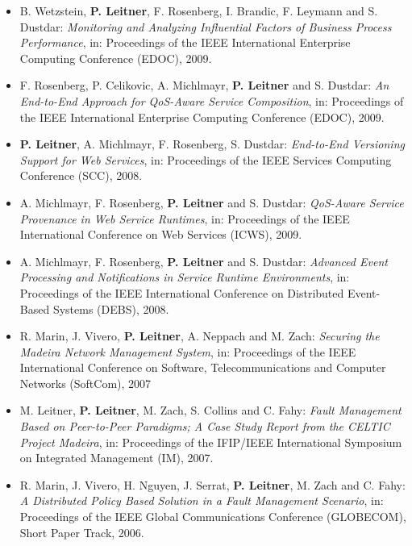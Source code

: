 \documentclass[paper=letter,fontsize=11pt]{scrartcl} %
\begin{document}
\begin{itemize}
\item B. Wetzstein, \textbf{P. Leitner}, F. Rosenberg, I. Brandic, F. Leymann and S. Dustdar: \emph{Monitoring and Analyzing Influential Factors of Business Process Performance}, in: Proceedings of the IEEE International Enterprise Computing Conference (EDOC), 2009. 
\item F. Rosenberg, P. Celikovic, A. Michlmayr, \textbf{P. Leitner} and S. Dustdar: \emph{An End-to-End Approach for QoS-Aware Service Composition}, in: Proceedings of the IEEE International Enterprise Computing Conference (EDOC), 2009. 
\item \textbf{P. Leitner}, A. Michlmayr, F. Rosenberg, S. Dustdar: \emph{End-to-End Versioning Support for Web Services}, in: Proceedings of the IEEE Services Computing Conference (SCC), 2008. 
\item A. Michlmayr, F. Rosenberg, \textbf{P. Leitner} and S. Dustdar: \emph{QoS-Aware Service Provenance in Web Service Runtimes}, in: Proceedings of the IEEE International Conference on Web Services (ICWS), 2009. 
\item A. Michlmayr, F. Rosenberg, \textbf{P. Leitner} and S. Dustdar: \emph{Advanced Event Processing and Notifications in Service Runtime Environments}, in: Proceedings of the IEEE International Conference on Distributed Event-Based Systems (DEBS), 2008. 
\item R. Marin, J. Vivero, \textbf{P. Leitner}, A. Neppach and M. Zach: \emph{Securing the Madeira Network Management System}, in: Proceedings of the IEEE International Conference on Software, Telecommunications and Computer Networks (SoftCom), 2007
\item M. Leitner, \textbf{P. Leitner}, M. Zach, S. Collins and C. Fahy: \emph{Fault
Management Based on Peer-to-Peer Paradigms; A Case Study Report from the CELTIC
Project Madeira}, in: Proceedings of the IFIP/IEEE International Symposium on Integrated
Management (IM), 2007. 
\item R. Marin, J. Vivero, H. Nguyen, J. Serrat, \textbf{P. Leitner}, M. Zach and C. Fahy: \emph{A Distributed Policy Based Solution in a Fault Management Scenario}, in: Proceedings of the IEEE Global Communications Conference (GLOBECOM), Short Paper Track, 2006. \\ 
\end{itemize}
\end{document}
